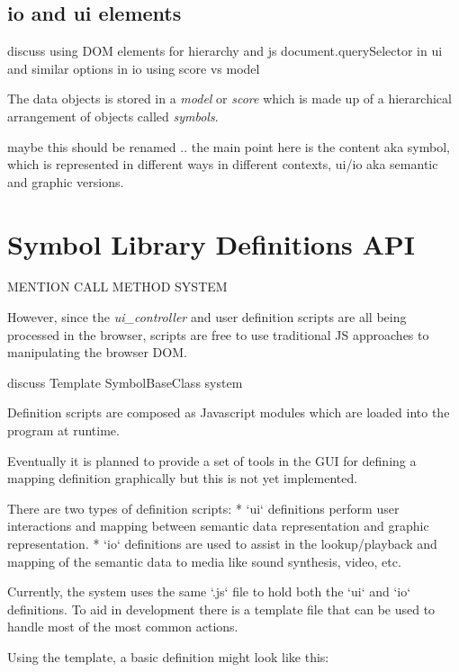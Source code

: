 \documentclass{article}
\begin{document}
\subsection{io and ui elements}\label{subsec:io_ui_elements}

discuss using DOM elements for hierarchy and js document.querySelector in ui
and similar options in io using score vs model


The data objects is stored in a \textit{model} or \textit{score} which is made up of a hierarchical arrangement of objects called \textit{symbols}.


maybe this should be renamed ..
the main point here is the content aka symbol, which is represented in different ways in different contexts, ui/io aka semantic and graphic versions.

\section{Symbol Library Definitions API}\label{library_definitions_api}

MENTION CALL METHOD SYSTEM	

However, since the \textit{ui\_controller} and user definition scripts are all being processed in the browser, scripts are free to use traditional JS approaches to manipulating the browser DOM.

discuss Template SymbolBaseClass system


Definition scripts are composed as Javascript modules which are loaded into the program at runtime.

Eventually it is planned to provide a set of tools in the GUI for defining a mapping definition graphically but this is not yet implemented.

There are two types of definition scripts:
* `ui` definitions perform user interactions and mapping between semantic data representation and graphic representation.
* `io` definitions are used to assist in the lookup/playback and mapping of the semantic data to media like sound synthesis, video, etc.

Currently, the system uses the same `.js` file to hold both the `ui` and `io` definitions. To aid in development there is a template file that can be used to handle most of the most common actions.

Using the template, a basic definition might look like this:
\end{document}
